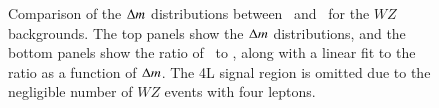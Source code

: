 \begin{itemize}
\begin{figure}[h]
{			
		}
		\caption{Comparison of the $\Delta m$ distributions between \powheg\ and \sherpa\ for the $WZ$ backgrounds. The top panels show the $\Delta m$ distributions, and the bottom panels show the ratio of \powheg\ to \sherpa, along with a linear fit to the ratio as a function of $\Delta m$. The 4L signal region is omitted due to the negligible number of $WZ$ events with four leptons.}
		\label{fig:systematic-WZ-shape}
	\end{figure}

	


\end{itemize}
